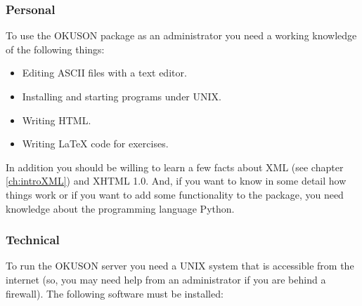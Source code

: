 \documentclass[12pt,openany,a4paper]{book}
\newcommand{\OKUSON}{\textsf{OKUSON}}
\begin{document}
\subsubsection*{Personal}
To use the {\OKUSON} package as an administrator you need a working
knowledge of the following things:
\begin{itemize}
\item Editing ASCII files with a text editor.
\item Installing and starting programs under UNIX.
\item Writing HTML.
\item Writing {\LaTeX} code for exercises.
\end{itemize}
In addition you should be willing to learn a few facts about XML (see
chapter \ref{ch:introXML}) and XHTML 1.0. And, if you want to know in some
detail how things work or if you want to add some functionality to the
package, you need knowledge about the programming language Python.

\subsubsection*{Technical}
To run the {\OKUSON} server you need a UNIX system that is accessible from
the internet (so, you may need help from an administrator if you are behind
a firewall). The following software must be installed:
\end{document}
